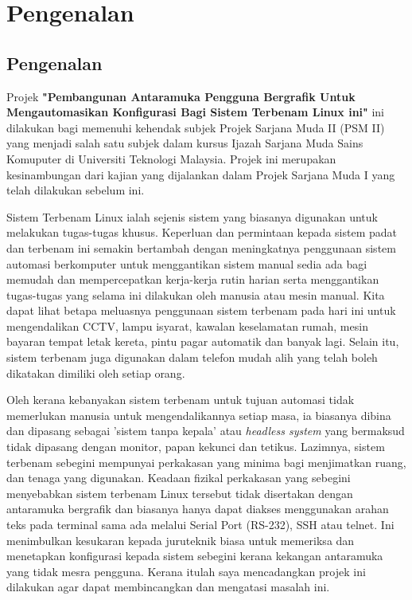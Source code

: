 \chapter{Pengenalan}\label{c1}%

\section{Pengenalan}
Projek \textbf{"Pembangunan Antaramuka Pengguna Bergrafik Untuk Mengautomasikan Konfigurasi Bagi Sistem Terbenam Linux ini"} ini dilakukan bagi memenuhi kehendak subjek Projek Sarjana Muda II (PSM II) yang menjadi salah satu subjek dalam kursus Ijazah Sarjana Muda Sains Komuputer di Universiti Teknologi Malaysia. Projek ini merupakan kesinambungan dari kajian yang dijalankan dalam Projek Sarjana Muda I yang telah dilakukan sebelum ini.

Sistem Terbenam Linux ialah sejenis sistem yang biasanya digunakan untuk melakukan tugas-tugas khusus. Keperluan dan permintaan kepada sistem padat dan terbenam ini semakin bertambah dengan meningkatnya penggunaan sistem automasi berkomputer untuk menggantikan sistem manual sedia ada bagi memudah dan mempercepatkan kerja-kerja rutin harian serta menggantikan tugas-tugas yang selama ini dilakukan oleh manusia atau mesin manual. Kita dapat lihat betapa meluasnya penggunaan sistem terbenam pada hari ini untuk mengendalikan CCTV, lampu isyarat, kawalan keselamatan rumah, mesin bayaran tempat letak kereta, pintu pagar automatik dan banyak lagi. Selain itu, sistem terbenam juga digunakan dalam telefon mudah alih yang telah boleh dikatakan dimiliki oleh setiap orang.

Oleh kerana kebanyakan sistem terbenam untuk tujuan automasi tidak memerlukan manusia untuk mengendalikannya setiap masa, ia biasanya dibina dan dipasang sebagai 'sistem tanpa kepala' atau \textit{headless system}\cite{w2} yang bermaksud tidak dipasang dengan monitor, papan kekunci dan tetikus. Lazimnya, sistem terbenam sebegini mempunyai perkakasan yang minima bagi menjimatkan ruang, dan tenaga yang digunakan. Keadaan fizikal perkakasan yang sebegini menyebabkan sistem terbenam Linux tersebut tidak disertakan dengan antaramuka bergrafik dan biasanya hanya dapat diakses menggunakan arahan teks pada terminal sama ada melalui Serial Port (RS-232), SSH atau telnet. Ini menimbulkan kesukaran kepada juruteknik biasa untuk memeriksa dan menetapkan konfigurasi kepada sistem sebegini kerana kekangan antaramuka yang tidak mesra pengguna. Kerana itulah saya mencadangkan projek ini dilakukan agar dapat membincangkan dan mengatasi masalah ini.

